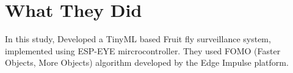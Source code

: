 \documentclass[../../main]{subfiles}
\begin{document}
\section{What They Did} \label{sec:}

In this study\cite{fruitfly}, Developed a TinyML based Fruit fly surveillance system,
implemented using ESP-EYE mircrocontroller. They used FOMO (Faster Objects,
More Objects) algorithm developed by the Edge Impulse platform.
\end{document}
